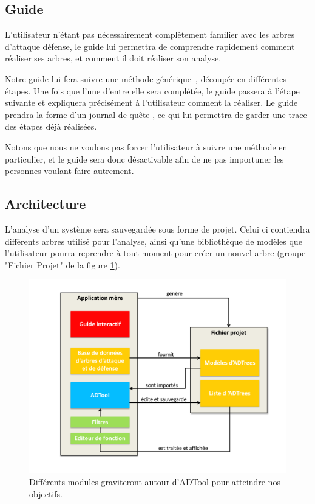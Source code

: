     \subsection{Guide}
        \label{sec:guide}

        L'utilisateur n'étant pas nécessairement complètement familier avec les arbres d'attaque défense, le guide lui permettra de comprendre rapidement comment réaliser ses arbres, et comment il doit réaliser son analyse.

        Notre guide lui fera suivre une méthode générique~\cite{methode_analyse}, découpée en différentes étapes. Une fois que l'une d'entre elle sera complétée, le guide passera à l'étape suivante et expliquera précisément à l'utilisateur comment la réaliser.
        Le guide prendra la forme d'un \og journal de quête \fg, ce qui lui permettra de garder une trace des étapes déjà réalisées.
        
        Notons que nous ne voulons pas forcer l'utilisateur à suivre une méthode en particulier, et le guide sera donc désactivable afin de ne pas importuner les personnes voulant faire autrement.

    \subsection{Architecture}
        \label{sec:archi}

        L'analyse d'un système sera sauvegardée sous forme de projet. Celui ci contiendra différents arbres utilisé pour l'analyse, ainsi qu'une bibliothèque de modèles que l'utilisateur pourra reprendre à tout moment pour créer un nouvel arbre (groupe "Fichier Projet" de la figure \ref{fig:archi}). 

        \begin{figure}
            \begin{center}
                \includegraphics[width=1\textwidth]{figure/archi.pdf}
            \end{center}
            \caption{Différents modules graviteront autour d'ADTool pour atteindre nos objectifs.}
            \label{fig:archi}
        \end{figure}

